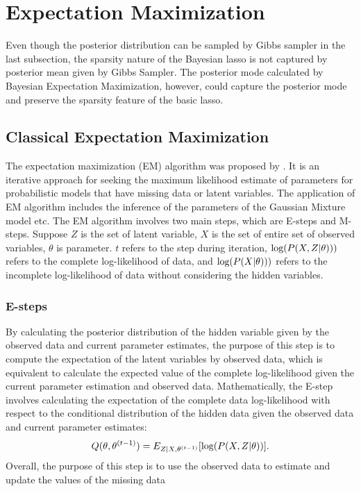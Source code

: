 \section{Expectation Maximization}
Even though the posterior distribution can be sampled by Gibbs sampler in the last subsection, the sparsity nature of the Bayesian lasso is not captured by  posterior mean given by Gibbs Sampler. The posterior mode calculated by Bayesian Expectation Maximization, however, could capture the posterior mode and preserve the sparsity feature of the basic lasso.

\subsection{Classical Expectation Maximization}
The expectation maximization (EM) algorithm was proposed by \cite{EM}. It is an iterative approach for seeking the maximum likelihood estimate of parameters for probabilistic models that have missing data or latent variables.
The application of EM algorithm includes the inference of the parameters of the Gaussian Mixture model etc. The EM algorithm involves two main steps, which are E-steps and M-steps.
Suppose $Z$ is the set of latent variable, $X$ is the set of entire set of observed variables, $\theta$ is parameter. $t$ refers to the step during iteration, $\textnormal{log}(P(X,Z|\theta)))$ refers to the complete log-likelihood of data, and $\textnormal{log}(P(X|\theta)))$ refers to the incomplete log-likelihood of data without considering the hidden variables.
\subsubsection{E-steps}
By calculating the posterior distribution of the hidden variable given by the observed data and current parameter estimates, the purpose of this step is to compute the expectation of the latent variables by observed data, which is equivalent to calculate the expected value of the complete log-likelihood given the current parameter estimation and observed data.
Mathematically, the E-step involves calculating the expectation of the complete data log-likelihood with respect to the conditional distribution of the hidden data given the observed data and current parameter estimates:
\begin{equation}
	Q(\theta,\theta^{(t-1)}) = E_{Z|X,\theta^{(t-1)}}[\textnormal{log}(P(X,Z|\theta))].
\end{equation}
Overall, the purpose of this step is to use the observed data to estimate and update the values of the missing data


